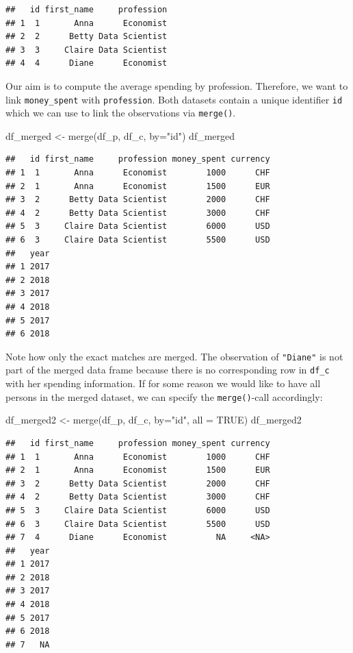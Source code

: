 \documentclass[
  12pt,
]{style/krantz}
\newenvironment{Shaded}{\begin{snugshade}}{\end{snugshade}}
\newcommand{\AttributeTok}[1]{\textcolor[rgb]{0.77,0.63,0.00}{#1}}
\newcommand{\ConstantTok}[1]{\textcolor[rgb]{0.00,0.00,0.00}{#1}}
\newcommand{\FunctionTok}[1]{\textcolor[rgb]{0.00,0.00,0.00}{#1}}
\newcommand{\NormalTok}[1]{#1}
\newcommand{\OtherTok}[1]{\textcolor[rgb]{0.56,0.35,0.01}{#1}}
\newcommand{\StringTok}[1]{\textcolor[rgb]{0.31,0.60,0.02}{#1}}
\begin{document}
\begin{verbatim}
##   id first_name     profession
## 1  1       Anna      Economist
## 2  2      Betty Data Scientist
## 3  3     Claire Data Scientist
## 4  4      Diane      Economist
\end{verbatim}

Our aim is to compute the average spending by profession. Therefore, we want to link \texttt{money\_spent} with \texttt{profession}. Both datasets contain a unique identifier \texttt{id} which we can use to link the observations via \texttt{merge()}.

\begin{Shaded}
\begin{Highlighting}[]
\NormalTok{df\_merged }\OtherTok{\textless{}{-}} \FunctionTok{merge}\NormalTok{(df\_p, df\_c, }\AttributeTok{by=}\StringTok{"id"}\NormalTok{)}
\NormalTok{df\_merged}
\end{Highlighting}
\end{Shaded}

\begin{verbatim}
##   id first_name     profession money_spent currency
## 1  1       Anna      Economist        1000      CHF
## 2  1       Anna      Economist        1500      EUR
## 3  2      Betty Data Scientist        2000      CHF
## 4  2      Betty Data Scientist        3000      CHF
## 5  3     Claire Data Scientist        6000      USD
## 6  3     Claire Data Scientist        5500      USD
##   year
## 1 2017
## 2 2018
## 3 2017
## 4 2018
## 5 2017
## 6 2018
\end{verbatim}

Note how only the exact matches are merged. The observation of \texttt{"Diane"} is not part of the merged data frame because there is no corresponding row in \texttt{df\_c} with her spending information. If for some reason we would like to have all persons in the merged dataset, we can specify the \texttt{merge()}-call accordingly:

\begin{Shaded}
\begin{Highlighting}[]
\NormalTok{df\_merged2 }\OtherTok{\textless{}{-}} \FunctionTok{merge}\NormalTok{(df\_p, df\_c, }\AttributeTok{by=}\StringTok{"id"}\NormalTok{, }\AttributeTok{all =} \ConstantTok{TRUE}\NormalTok{)}
\NormalTok{df\_merged2}
\end{Highlighting}
\end{Shaded}

\begin{verbatim}
##   id first_name     profession money_spent currency
## 1  1       Anna      Economist        1000      CHF
## 2  1       Anna      Economist        1500      EUR
## 3  2      Betty Data Scientist        2000      CHF
## 4  2      Betty Data Scientist        3000      CHF
## 5  3     Claire Data Scientist        6000      USD
## 6  3     Claire Data Scientist        5500      USD
## 7  4      Diane      Economist          NA     <NA>
##   year
## 1 2017
## 2 2018
## 3 2017
## 4 2018
## 5 2017
## 6 2018
## 7   NA
\end{verbatim}
\end{document}
